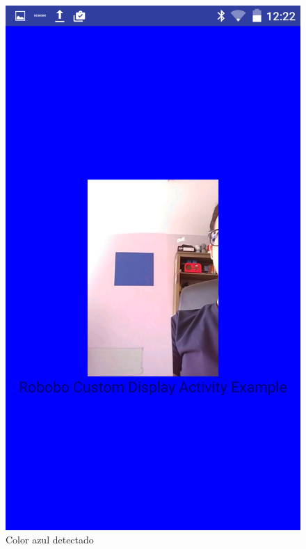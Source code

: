 \begin{figure}
\centering
\begin{minipage}{0.45\textwidth}
\centering
\includegraphics[width=1\linewidth]{imagenes/color_detection_blue.png}
\caption{Color azul detectado}
\label{fig:blue_color}


\end{minipage}
\end{figure}
